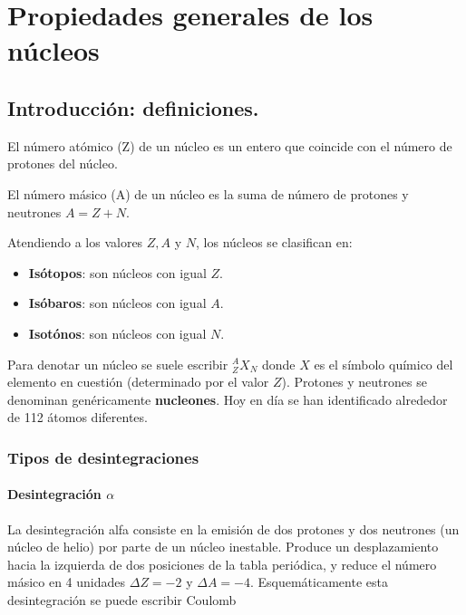 
\chapter{Propiedades generales de los núcleos}


\section{Introducción: definiciones.}

\begin{definition}
    El número atómico (Z) de un núcleo es un entero que coincide con el número de protones del núcleo. 
\end{definition}    


\begin{definition}
    El número másico (A) de un núcleo es la suma de número de protones y neutrones $A=Z+N$.
\end{definition}    

Atendiendo a los valores $Z,A$ y $N$, los núcleos se clasifican en:

\begin{itemize}
    \item \textbf{Isótopos}: son núcleos con igual $Z$. 
    \item \textbf{Isóbaros}: son núcleos con igual $A$. 
    \item \textbf{Isotónos}: son núcleos con igual $N$. 
\end{itemize}

Para denotar un núcleo se suele escribir $^A_Z X_N$ donde $X$ es el símbolo químico del elemento en cuestión (determinado por el valor $Z$). Protones y neutrones se denominan genéricamente \textbf{nucleones}. Hoy en día se han identificado alrededor de 112 átomos diferentes. 

\subsection{Tipos de desintegraciones}

\subsubsection{Desintegración $\alpha$}

La desintegración alfa consiste en la emisión de dos protones y dos neutrones (un núcleo de helio) por parte de un núcleo inestable. Produce un desplazamiento hacia la izquierda de dos posiciones de la tabla periódica, y reduce el número másico en 4 unidades $\Delta Z = -2$ y $\Delta A  = -4$. Esquemáticamente esta desintegración se puede escribir Coulomb

